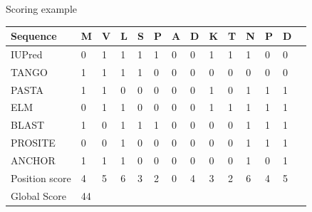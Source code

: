 \documentclass{beamer}
\begin{document}
% 
\begin{frame}{Scoring example}
 \begin{tabular}{llllllllllllll} 
\hline
\rowcolor{GrayOscuro}Sequence & \textbf{M} & \textbf{V} & \textbf{L} & \textbf{S} & \textbf{P} & \textbf{A} & \textbf{D} & \textbf{K} & \textbf{T} & \textbf{N} & \textbf{P} & \textbf{D} \\ \hline \hline
 
\rowcolor{Gray}IUPred           	& 0 & 1 & 1 & 1 & 1 & 0 & 0 & 1 & 1 & 1 & 0 & 0\\ \hline  
TANGO 		       			& 1 & 1 & 1 & 1 & 0 & 0 & 0 & 0 & 0 & 0 & 0 & 0\\ \hline  
\rowcolor{Gray}PASTA			& 1 & 1 & 0 & 0 & 0 & 0 & 0 & 1 & 0 & 1 & 1 & 1\\ \hline  
ELM          	      			& 0 & 1 & 1 & 0 & 0 & 0 & 0 & 1 & 1 & 1 & 1 & 1\\ \hline 
\rowcolor{Gray}BLAST			& 1 & 0 & 1 & 1 & 1 & 0 & 0 & 0 & 0 & 1 & 1 & 1\\ \hline 
PROSITE 	      			& 0 & 0 & 1 & 0 & 0 & 0 & 0 & 0 & 0 & 1 & 1 & 1\\ \hline 
\rowcolor{Gray}ANCHOR	        	& 1 & 1 & 1 & 0 & 0 & 0 & 0 & 0 & 0 & 1 & 0 & 1\\ \hline \hline
\rowcolor{GrayOscuro}Position score     & 4 & 5 & 6 & 3 & 2 & 0 & 4 & 3 & 2 & 6 & 4 & 5\\ \hline
\rowcolor{GrayOscuro}Global Score  & 44 &&&&&&&&&&& \\ \hline
\end{tabular}
\end{frame}










\end{document}
